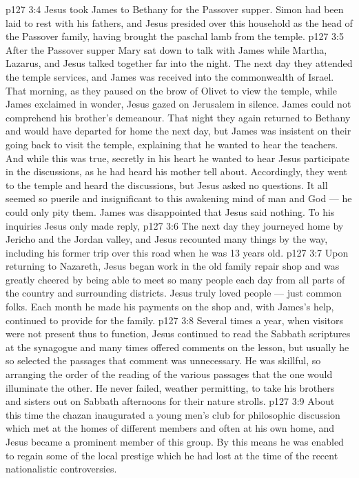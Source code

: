 \vs p127 3:4 Jesus took James to Bethany for the Passover supper. Simon had been laid to rest with his fathers, and Jesus presided over this household as the head of the Passover family, having brought the paschal lamb from the temple.
\vs p127 3:5 After the Passover supper Mary sat down to talk with James while Martha, Lazarus, and Jesus talked together far into the night. The next day they attended the temple services, and James was received into the commonwealth of Israel. That morning, as they paused on the brow of Olivet to view the temple, while James exclaimed in wonder, Jesus gazed on Jerusalem in silence. James could not comprehend his brother’s demeanour. That night they again returned to Bethany and would have departed for home the next day, but James was insistent on their going back to visit the temple, explaining that he wanted to hear the teachers. And while this was true, secretly in his heart he wanted to hear Jesus participate in the discussions, as he had heard his mother tell about. Accordingly, they went to the temple and heard the discussions, but Jesus asked no questions. It all seemed so puerile and insignificant to this awakening mind of man and God --- he could only pity them. James was disappointed that Jesus said nothing. To his inquiries Jesus only made reply, 
\vs p127 3:6 The next day they journeyed home by Jericho and the Jordan valley, and Jesus recounted many things by the way, including his former trip over this road when he was 13 years old.
\vs p127 3:7 \pc Upon returning to Nazareth, Jesus began work in the old family repair shop and was greatly cheered by being able to meet so many people each day from all parts of the country and surrounding districts. Jesus truly loved people --- just common folks. Each month he made his payments on the shop and, with James’s help, continued to provide for the family.
\vs p127 3:8 Several times a year, when visitors were not present thus to function, Jesus continued to read the Sabbath scriptures at the synagogue and many times offered comments on the lesson, but usually he so selected the passages that comment was unnecessary. He was skillful, so arranging the order of the reading of the various passages that the one would illuminate the other. He never failed, weather permitting, to take his brothers and sisters out on Sabbath afternoons for their nature strolls.
\vs p127 3:9 About this time the chazan inaugurated a young men’s club for philosophic discussion which met at the homes of different members and often at his own home, and Jesus became a prominent member of this group. By this means he was enabled to regain some of the local prestige which he had lost at the time of the recent nationalistic controversies.
